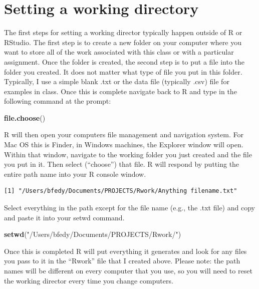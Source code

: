 \documentclass[
]{book}
\newenvironment{Shaded}{\begin{snugshade}}{\end{snugshade}}
\newcommand{\FunctionTok}[1]{\textcolor[rgb]{0.13,0.29,0.53}{\textbf{#1}}}
\newcommand{\NormalTok}[1]{#1}
\newcommand{\StringTok}[1]{\textcolor[rgb]{0.31,0.60,0.02}{#1}}
\begin{document}
\hypertarget{setting-a-working-directory}{%
\section{Setting a working directory}\label{setting-a-working-directory}}

The first steps for setting a working director typically happen outside of R or RStudio. The first step is to create a new folder on your computer where you want to store all of the work associated with this class or with a particular assignment. Once the folder is created, the second step is to put a file into the folder you created. It does not matter what type of file you put in this folder. Typically, I use a simple blank .txt or the data file (typically .csv) file for examples in class. Once this is complete navigate back to R and type in the following command at the prompt:

\begin{Shaded}
\begin{Highlighting}[]
\FunctionTok{file.choose}\NormalTok{()}
\end{Highlighting}
\end{Shaded}

R will then open your computers file management and navigation system. For Mac OS this is Finder, in Windows machines, the Explorer window will open. Within that window, navigate to the working folder you just created and the file you put in it. Then select (``choose'') that file. R will respond by putting the entire path name into your R console window.

\begin{verbatim}
[1] "/Users/bfedy/Documents/PROJECTS/Rwork/Anything filename.txt"
\end{verbatim}

Select everything in the path except for the file name (e.g., the .txt file) and copy and paste it into your setwd command.

\begin{Shaded}
\begin{Highlighting}[]
\FunctionTok{setwd}\NormalTok{(}\StringTok{"/Users/bfedy/Documents/PROJECTS/Rwork/"}\NormalTok{)}
\end{Highlighting}
\end{Shaded}

Once this is completed R will put everything it generates and look for any files you pass to it in the ``Rwork'' file that I created above. Please note: the path names will be different on every computer that you use, so you will need to reset the working director every time you change computers.
\end{document}
